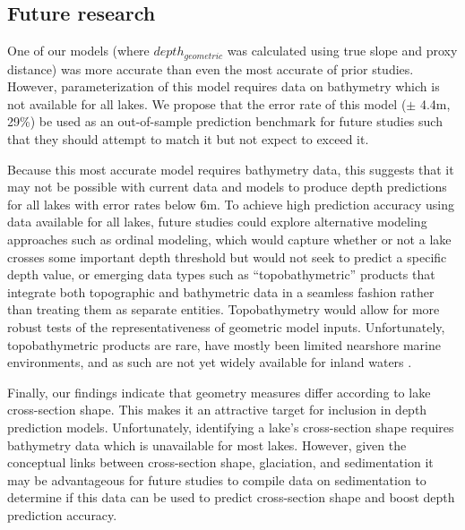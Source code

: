 \documentclass[draft]{agujournal2019}
\begin{document}
\subsection{Future research}
\noindent
One of our models (where $depth_{geometric}$ was calculated using true slope and proxy distance) was more accurate than even the most accurate of prior studies. However, parameterization of this model requires data on bathymetry which is not available for all lakes. We propose that the error rate of this model ($\pm$ 4.4m, 29\%) be used as an out-of-sample prediction benchmark for future studies such that they should attempt to match it but not expect to exceed it.

Because this most accurate model requires bathymetry data, this suggests that it may not be possible with current data and models to produce depth predictions for all lakes with error rates below 6m. To achieve high prediction accuracy using data available for all lakes, future studies could explore alternative modeling approaches such as ordinal modeling, which would capture whether or not a lake crosses some important depth threshold but would not seek to predict a specific depth value, or emerging data types such as “topobathymetric” products that integrate both topographic and bathymetric data in a seamless fashion rather than treating them as separate entities. Topobathymetry would allow for more robust tests of the representativeness of geometric model inputs. Unfortunately, topobathymetric products are rare, have mostly been limited nearshore marine environments, and as such are not yet widely available for inland waters \cite{danielsonTopobathymetricElevationModel2016}.

Finally, our findings indicate that geometry measures differ according to lake cross-section shape. This makes it an attractive target for inclusion in depth prediction models. Unfortunately, identifying a lake’s cross-section shape requires bathymetry data which is unavailable for most lakes. However, given the conceptual links between cross-section shape, glaciation, and sedimentation \cite{johanssonNewApproachesModelling2007} it may be advantageous for future studies to compile data on sedimentation to determine if this data can be used to predict cross-section shape and boost depth prediction accuracy.
\end{document}
